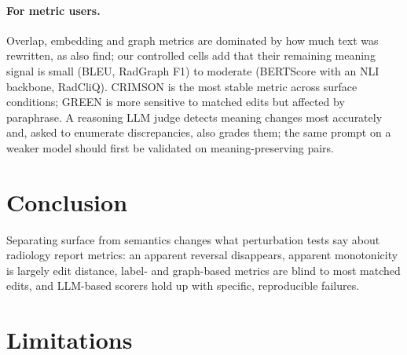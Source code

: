 \documentclass[11pt]{article}
\begin{document}
\paragraph{For metric users.}
Overlap, embedding and graph metrics are dominated by how much text was rewritten, as \citet{reref-2026} also find; our controlled cells add that their remaining meaning signal is small (BLEU, RadGraph F1) to moderate (BERTScore with an NLI backbone, RadCliQ). CRIMSON is the most stable metric across surface conditions; GREEN is more sensitive to matched edits but affected by paraphrase. A reasoning LLM judge detects meaning changes most accurately and, asked to enumerate discrepancies, also grades them; the same prompt on a weaker model should first be validated on meaning-preserving pairs.

\section{Conclusion}

Separating surface from semantics changes what perturbation tests say about radiology report metrics: an apparent reversal disappears, apparent monotonicity is largely edit distance, label- and graph-based metrics are blind to most matched edits, and LLM-based scorers hold up with specific, reproducible failures.

\section*{Limitations}
\end{document}
